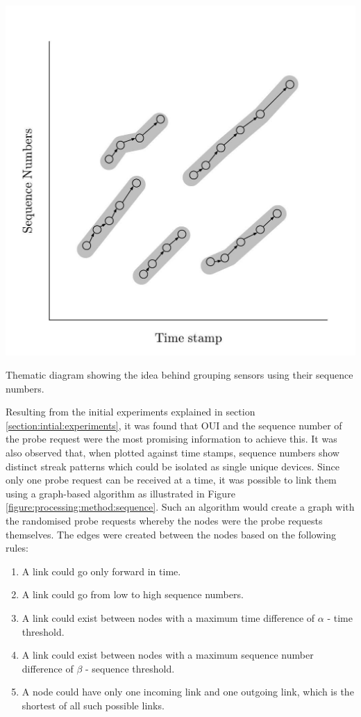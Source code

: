 \begin{marginfigure}
  \includegraphics[trim={5 5 5 5}, clip]{images/processing-method-sequence.jpg}
  \caption{Thematic diagram showing the idea behind grouping sensors using their sequence numbers.}
  \label{figure:processing:method:sequence}
\end{marginfigure}

Resulting from the initial experiments explained in section \ref{section:intial:experiments}, it was found that OUI and the sequence number of the probe request were the most promising information to achieve this.
It was also observed that, when plotted against time stamps, sequence numbers show distinct streak patterns which could be isolated as single unique devices.
Since only one probe request can be received at a time, it was possible to link them using a graph-based algorithm as illustrated in Figure \ref{figure:processing:method:sequence}.
Such an algorithm would create a graph with the randomised probe requests whereby the nodes were the probe requests themselves.
The edges were created between the nodes based on the following rules:

\begin{enumerate}[rightmargin=3em, leftmargin=3em] 
  \itemsep-0.5em
  \item A link could go only forward in time.
  \item A link could go from low to high sequence numbers. 
  \item A link could exist between nodes with a maximum time difference of $\alpha$ - time threshold.
  \item A link could exist between nodes with a maximum sequence number difference of $\beta$ - sequence threshold.
  \item A node could have only one incoming link and one outgoing link, which is the shortest of all such possible links.
\end{enumerate}

